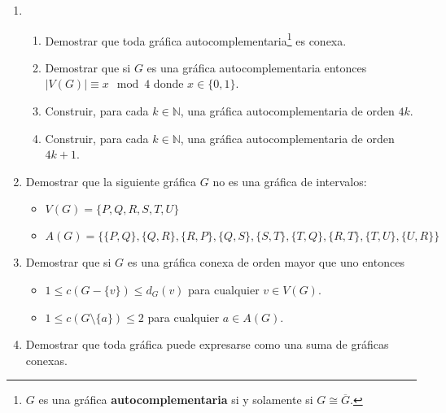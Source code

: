 \documentclass[12pt]{report}
\numberwithin{section}{chapter}
\begin{document}
\begin{enumerate}
\item
\begin{enumerate}
\item Demostrar que toda gráfica autocomplementaria\footnote{$G$ es una gráfica \textbf{autocomplementaria} si y solamente si $G \cong \overline G$.} es conexa.

\item Demostrar que si $G$ es una gráfica autocomplementaria entonces $|V(G)| \equiv x \mod 4$ donde $x \in \{0,1\}$.

\item Construir, para cada $k \in \mathbb N$, una gráfica autocomplementaria de orden $4k$.

\item Construir, para cada $k \in \mathbb N$, una gráfica autocomplementaria de orden $4k+1$.

\end{enumerate}

\item Demostrar que la siguiente gráfica $G$ no es una gráfica de intervalos:
\begin{itemize}
\item $V(G)=\{P,Q,R,S,T,U\}$
\item $A(G) = \{\{P,Q\},\{Q,R\},\{R,P\},\{Q,S\},\{S,T\},\{T,Q\},\{R,T\},\{T,U\},\{U,R\}\}$
\end{itemize}

\item Demostrar que si $G$ es una gráfica conexa de orden mayor que uno entonces
\begin{itemize}
\item $1 \leq c(G-\{v\}) \leq d_G(v)$ para cualquier $v \in V(G)$.
\item $1 \leq c(G\setminus \{a\}) \leq 2$ para cualquier $a \in A(G)$.
\end{itemize}


\item Demostrar que toda gráfica puede expresarse como una suma de gráficas conexas.




\end{enumerate}
\end{document}
